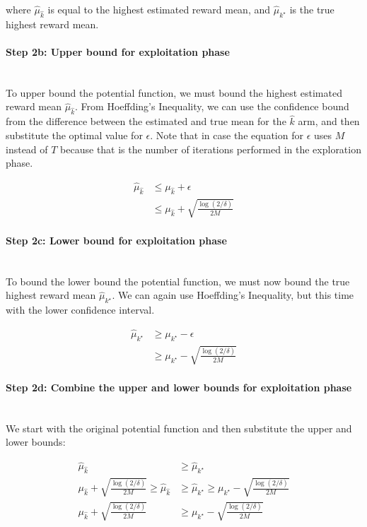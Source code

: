 \documentclass[11pt]{article}
\begin{document}
where $\hat{\mu}_{\hat{k}}$ is equal to the highest estimated reward mean, and $\hat{\mu}_{k^\star}$ is the true highest reward mean. 

\paragraph{Step 2b: Upper bound for exploitation phase}
\noindent \\
To upper bound the potential function, we must bound the highest estimated reward mean  $\hat{\mu}_{\hat{k}}$. From Hoeffding's Inequality, we can use the confidence bound from the difference between the estimated and true mean for the $\hat{k}$ arm, and then substitute the optimal value for $\epsilon$. Note that in case the equation for $\epsilon$ uses $M$ instead of $T$ because that is the number of iterations performed in the exploration phase.

\begin{align}
    \hat{\mu}_{\hat{k}} &\leq \mu_{\hat{k}} + \epsilon \\
    &\leq \mu_{\hat{k}} + \sqrt{\frac{\log(2 / \delta)}{2M}}
\end{align}

\paragraph{Step 2c: Lower bound for exploitation phase}
\noindent \\
To bound the lower bound the potential function, we must now bound the true highest reward mean $\hat{\mu}_{k^\star}$. We can again use Hoeffding's Inequality, but this time with the lower confidence interval.

\begin{align}
    \hat{\mu}_{k^\star} &\geq \mu_{k^\star} - \epsilon \\
    &\geq \mu_{k^\star} - \sqrt{\frac{\log(2 / \delta)}{2M}}
\end{align}

\paragraph{Step 2d: Combine the upper and lower bounds for exploitation phase}
\noindent \\
We start with the original potential function and then substitute the upper and lower bounds:

\begin{align}
    \hat{\mu}_{\hat{k}} &\geq \hat{\mu}_{k^\star} \\
    \mu_{\hat{k}} + \sqrt{\frac{\log(2 / \delta)}{2M}} \geq \hat{\mu}_{\hat{k}} &\geq \hat{\mu}_{k^\star} \geq \mu_{k^\star} - \sqrt{\frac{\log(2 / \delta)}{2M}} \\
    \mu_{\hat{k}} + \sqrt{\frac{\log(2 / \delta)}{2M}} &\geq \mu_{k^\star} - \sqrt{\frac{\log(2 / \delta)}{2M}}
\end{align}
\end{document}
